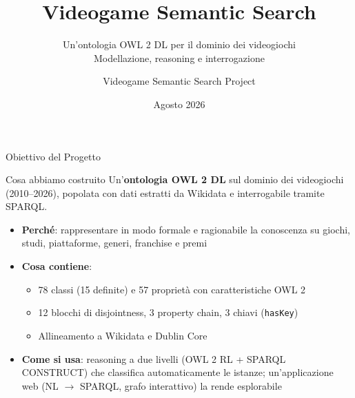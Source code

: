 \documentclass[aspectratio=169,11pt]{beamer}
\title{Videogame Semantic Search}
\subtitle{Un'ontologia OWL 2 DL per il dominio dei videogiochi \\ Modellazione, reasoning e interrogazione}
\author{Videogame Semantic Search Project}
\date{Agosto 2026}
\begin{document}
\begin{frame}[plain]
  \titlepage
\end{frame}

\begin{frame}{Obiettivo del Progetto}
  \begin{block}{Cosa abbiamo costruito}
    Un'\textbf{ontologia OWL 2 DL} sul dominio dei videogiochi (2010--2026),
    popolata con dati estratti da Wikidata e interrogabile tramite SPARQL.
  \end{block}

  \vspace{4pt}

  \begin{itemize}
    \item \textbf{Perch\'e}: rappresentare in modo formale e ragionabile la conoscenza su
      giochi, studi, piattaforme, generi, franchise e premi
    \item \textbf{Cosa contiene}:
    \begin{itemize}
      \item 78 classi (15 definite) e 57 propriet\`a con caratteristiche OWL 2
      \item 12 blocchi di disjointness, 3 property chain, 3 chiavi (\texttt{hasKey})
      \item Allineamento a Wikidata e Dublin Core
    \end{itemize}
    \item \textbf{Come si usa}: reasoning a due livelli (OWL 2 RL + SPARQL CONSTRUCT) che
      classifica automaticamente le istanze; un'applicazione web (NL $\to$ SPARQL, grafo
      interattivo) la rende esplorabile
  \end{itemize}
\end{frame}
\end{document}
